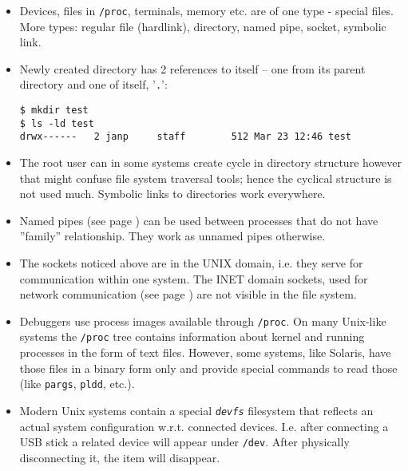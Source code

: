 \begin{itemize}
\item Devices, files in \texttt{/proc}, terminals, memory etc. are of one type
- special files. More types: regular file (hardlink), directory, named pipe,
socket, symbolic link.
\item Newly created directory has 2 references to itself -- one from its parent
directory and one of itself, '\texttt{.}':

\begin{verbatim}
$ mkdir test
$ ls -ld test
drwx------   2 janp     staff        512 Mar 23 12:46 test
\end{verbatim}

\item The root user can in some systems create cycle in directory structure
however that might confuse file system traversal tools; hence the cyclical
structure is not used much. Symbolic links to directories work everywhere.
\item Named pipes (see page \pageref{MKFIFO}) can be used between processes
that do not have ''family'' relationship.  They work as unnamed pipes otherwise.
\item The sockets noticed above are in the UNIX domain, i.e. they serve for
communication within one system. The INET domain sockets, used for network
communication (see page \pageref{NETWORKING}) are not visible in the file
system.
\item Debuggers use process images available through \texttt{/proc}.
On many Unix-like systems the \texttt{/proc} tree contains information about
kernel and running processes in the form of text files.  However, some systems,
like Solaris, have those files in a binary form only and provide special
commands to read those (like \texttt{pargs}, \texttt{pldd}, etc.).
\item Modern Unix systems contain a special \emph{\texttt{devfs}} filesystem
that reflects an actual system configuration w.r.t. connected devices. I.e.
after connecting a USB stick a related device will appear under \texttt{/dev}.
After physically disconnecting it, the item will disappear.
\end{itemize}

\endinput
